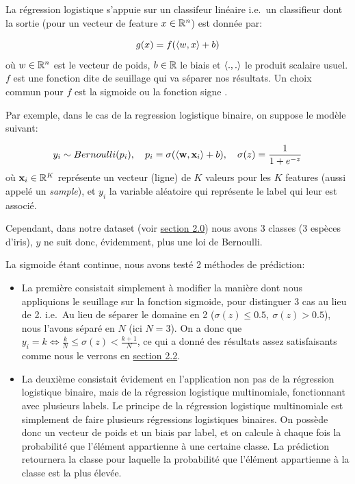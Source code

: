 \documentclass[
]{article}
\providecommand{\tightlist}{%
  \setlength{\itemsep}{0pt}\setlength{\parskip}{0pt}}
\begin{document}
La régression logistique s'appuie sur un classifeur linéaire
\cite{ClassifieurLineaire2022} i.e.~un classifieur dont la sortie (pour
un vecteur de feature \(x \in \mathbb{R}^n\)) est donnée par:

\[
g(x) = f(\langle w, x \rangle + b)
\] où \(w \in \mathbb{R}^n\) est le vecteur de poids, \(b \in \mathbb{R}\) le biais et
\(\langle ., . \rangle\) le produit scalaire usuel. \(f\) est une fonction
dite de seuillage qui va séparer nos résultats. Un choix commun pour
\(f\) est la sigmoide ou la fonction signe
\cite{ClassifieurLineaire2022}.

Par exemple, dans le cas de la regression logistique binaire, on suppose
le modèle suivant:

\[
y_i \sim Bernoulli(p_i),\quad p_i = \sigma(\langle \mathbf{w}, \mathbf{x}_i \rangle + b),\quad \sigma(z) = \frac{1}{1 + e^{-z}}
\] où \(\mathbf{x}_i \in \mathbb{R}^K\) représente un vecteur (ligne) de \(K\)
valeurs pour les \(K\) features (aussi appelé un \emph{sample}), et
\(y_i\) la variable aléatoire qui représente le label qui leur est
associé.

Cependant, dans notre dataset (voir
\href{#choix-du-dataset-outils-utilisuxe9s}{section 2.0}) nous avons 3
classes (3 espèces d'iris), \(y\) ne suit donc, évidemment, plus une loi
de Bernoulli.

La sigmoide étant continue, nous avons testé 2 méthodes de prédiction:

\begin{itemize}
\tightlist
\item
  La première consistait simplement à modifier la manière dont nous
  appliquions le seuillage sur la fonction sigmoide, pour distinguer 3
  cas au lieu de 2. i.e.~Au lieu de séparer le domaine en 2
  (\(\sigma(z) \leq 0.5,\ \sigma(z) > 0.5\)), nous l'avons séparé en
  \(N\) (ici \(N = 3\)). On a donc que
  \(y_i = k \Leftrightarrow \frac{k}{N} \leq \sigma(z) < \frac{k + 1}{N}\),
  ce qui a donné des résultats assez satisfaisants comme nous le verrons
  en \href{#ruxe9gression-logistique-1}{section 2.2}.
\item
  La deuxième consistait évidement en l'application non pas de la
  régression logistique binaire, mais de la régression logistique
  multinomiale, fonctionnant avec plusieurs labels. Le principe de la
  régression logistique multinomiale est simplement de faire plusieurs
  régressions logistiques binaires. On possède donc un vecteur de poids
  et un biais par label, et on calcule à chaque fois la probabilité que
  l'élément appartienne à une certaine classe. La prédiction retournera
  la classe pour laquelle la probabilité que l'élément appartienne à la
  classe est la plus élevée.
\end{itemize}
\end{document}
